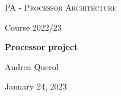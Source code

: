 \makeatletter

\begin{titlepage}
\thispagestyle{empty}
\begin{center}
	\centering
	\vspace{1cm}
	{\scshape\Large PA - Processor Architecture\par}
	\vspace{0.75cm}
	{\Large Course 2022/23 \par}
	\vspace{0.75cm} 
	{\huge\bfseries Processor project \par}
	\vspace{1cm}
        {\Large Andrea Querol \par}
	\vspace{1cm}
    \vspace{0.5cm}
    

 \vfill
	{\large January 24, 2023\par}
\end{center}


\clearpage
\end{titlepage}
